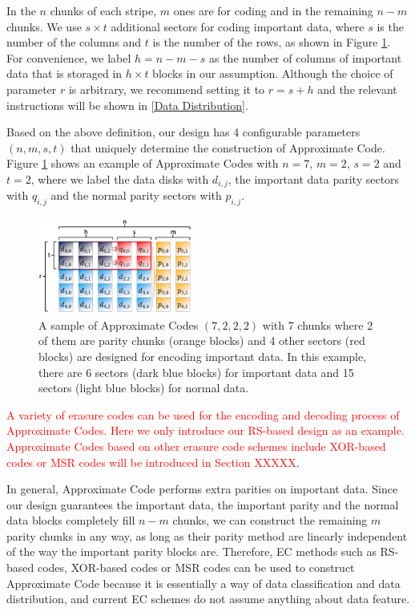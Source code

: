 \documentclass[sigconf]{acmart}
\begin{document}
In the $n$ chunks of each stripe, $m$ ones are for coding and in the remaining $n-m$ chunks. 
We use $s \times t$ additional sectors for coding important data, where $s$ is the number of the columns and $t$ is the number of the rows, as shown in Figure \ref{apcode-7222-v5}.
For convenience, we label $h=n-m-s$ as the number of columns of important data that is storaged in $h \times t$ blocks in our assumption.
Although the choice of parameter $r$ is arbitrary, we recommend setting it to $r=s+h$ and the relevant instructions will be shown in \ref{Data Distribution}.

Based on the above definition, our design has 4 configurable parameters $(n, m, s,t)$ that uniquely determine the construction of Approximate Code.
Figure \ref{apcode-7222-v5} shows an example of Approximate Codes with $n = 7$, $m = 2$, $s=2$ and $t = 2$, where we label the data disks with $d_{i,j}$, the important data parity sectors with $q_{i,j}$ and the normal parity sectors with $p_{i,j}$. 

\begin{figure}[htbp]
\centering
\includegraphics[width=0.45\textwidth]{photo/apcode-7222-v5.PDF}
\caption{A sample of Approximate Codes $(7,2,2,2)$ with 7 chunks where 2 of them are parity chunks (orange blocks) and 4 other sectors (red blocks) are designed for encoding important data. In this example, there are 6 sectors (dark blue blocks) for important data and 15 sectors (light blue blocks) for normal data.}
\label{apcode-7222-v5}
\end{figure}

\textcolor{red}{A variety of erasure codes can be used for the encoding and decoding process of Approximate Codes. Here we only introduce our RS-based design as an example. 
Approximate Codes based on other erasure code schemes include XOR-based codes or MSR codes will be introduced in Section XXXXX}.

In general, Approximate Code performs extra parities on important data.
Since our design guarantees the important data, the important parity and the normal data blocks completely fill $n-m$ chunks, we can construct the remaining $m$ parity chunks in any way, as long as their parity method are linearly independent of the way the important parity blocks are. Therefore, EC methods such as RS-based codes, XOR-based codes or MSR codes can be used to construct Approximate Code because it is essentially a way of data classification and data distribution, and current EC schemes do not assume anything about data feature.
\end{document}
